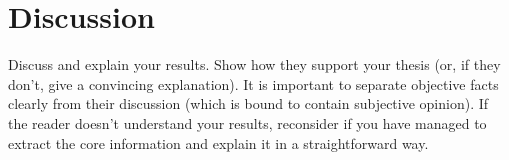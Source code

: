 \chapter{Discussion}

Discuss and explain your results. Show how they support your thesis (or, if they don't, give a convincing explanation). It is important to separate objective facts clearly from their discussion (which is bound to contain subjective opinion). If the reader doesn't understand your results, reconsider if you have managed to extract the core information and explain it in a straightforward way.

